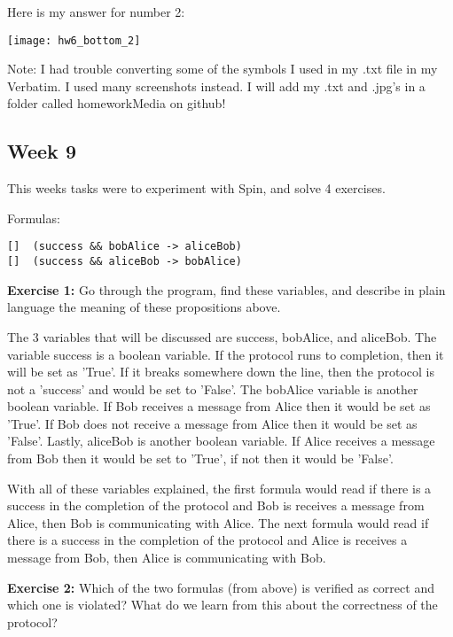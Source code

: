 \documentclass{article}
\theoremstyle{theorem}
\theoremstyle{definition}
\theoremstyle{remark}
\begin{document}
\noindent\newline Here is my answer for number 2:

\texttt{[image: hw6\_bottom\_2]}\noindent\newline


\noindent Note: I had trouble converting some of the symbols I used in my .txt file in my Verbatim. I used many screenshots instead. I will add my .txt and .jpg's in a folder called homeworkMedia on github!


\subsection{Week 9}
This weeks tasks were to experiment with Spin, and solve 4 exercises.

\noindent\newline Formulas:
\begin{verbatim}
[]  (success && bobAlice -> aliceBob)
[]  (success && aliceBob -> bobAlice)
\end{verbatim}


\noindent\newline\textbf{Exercise 1:} 
Go through the program, find these variables, and describe in plain language the meaning of these propositions above.

\noindent\newline The 3 variables that will be discussed are success, bobAlice, and aliceBob. The variable success is a boolean variable. If the protocol runs to completion, then it will be set as 'True'. If it breaks somewhere down the line, then the protocol is not a 'success' and would be set to 'False'. The bobAlice variable is another boolean variable. If Bob receives a message from Alice then it would be set as 'True'. If Bob does not receive a message from Alice then it would be set as 'False'. Lastly, aliceBob is another boolean variable. If Alice receives a message from Bob then it would be set to 'True', if not then it would be 'False'.

\noindent\newline With all of these variables explained, the first formula would read if there is a success in the completion of the protocol and Bob is receives a message from Alice, then Bob is communicating with Alice. The next formula would read if there is a success in the completion of the protocol and Alice is receives a message from Bob, then Alice is communicating with Bob.


\noindent\newline\textbf{Exercise 2:} 
Which of the two formulas (from above) is verified as correct and which one is violated? What do we learn from this about the correctness of the protocol?
\end{document}
